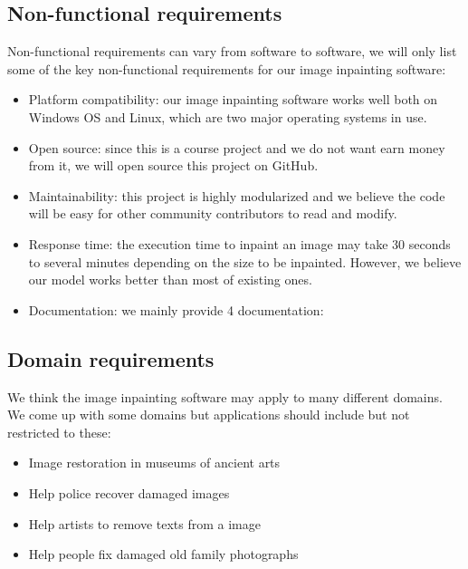 \subsection{Non-functional requirements}
Non-functional requirements can vary from software to software, we will only list some of the key non-functional requirements for our image inpainting software:
\begin{itemize}
\item Platform compatibility: our image inpainting software works well both on Windows OS and Linux, which are two major operating systems in use.
\item Open source: since this is a course project and we do not want earn money from it, we will open source this project on GitHub.
\item Maintainability: this project is highly modularized and we believe the code will be easy for other community contributors to read and modify.
\item Response time: the execution time to inpaint an image may take 30 seconds to several minutes depending on the size to be inpainted. However, we believe our model works better than most of existing ones.
\item Documentation: we mainly provide 4 documentation:
\end{itemize}
\subsection{Domain requirements}
We think the image inpainting software may apply to many different domains. We come up with some domains but applications should include but not restricted to these:
\begin{itemize}
\item Image restoration in museums of ancient arts
\item Help police recover damaged images
\item Help artists to remove texts from a image
\item Help people fix damaged old family photographs
\end{itemize}
